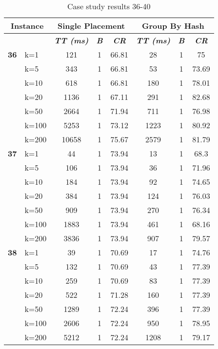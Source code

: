     \begin{table}[htbp]
    \caption{Case study results 36-40}
    \centering
    \begin{tabular}{|l|l|c|c|c|c|c|c|}
    \hline
    \multicolumn{ 2}{|c|}{\textbf{Instance}} & \multicolumn{ 3}{c|}{\textbf{Single Placement}} & \multicolumn{ 3}{c|}{\textbf{Group By Hash}} \\ \hline
    \multicolumn{ 2}{|l|}{} & \textbf{\textit{TT (ms)}} & \textbf{\textit{B}} & \textbf{\textit{CR}} & \textbf{\textit{TT (ms)}} & \textbf{\textit{B}} & \textbf{\textit{CR}} \\ \hline
    \multicolumn{1}{|r|}{\textbf{36}} & k=1 & 121 & 1 & 66.81 & 28 & 1 & 75 \\ 
     & k=5 & 343 & 1 & 66.81 & 53 & 1 & 73.69 \\ 
     & k=10 & 618 & 1 & 66.81 & 180 & 1 & 78.01 \\ 
     & k=20 & 1136 & 1 & 67.11 & 291 & 1 & 82.68 \\ 
     & k=50 & 2664 & 1 & 71.94 & 711 & 1 & 76.98 \\ 
     & k=100 & 5253 & 1 & 73.12 & 1223 & 1 & 80.92 \\ 
     & k=200 & 10658 & 1 & 75.67 & 2579 & 1 & 81.79 \\ \hline
    \multicolumn{1}{|r|}{\textbf{37}} & k=1 & 44 & 1 & 73.94 & 13 & 1 & 68.3 \\ 
     & k=5 & 106 & 1 & 73.94 & 36 & 1 & 71.96 \\ 
     & k=10 & 184 & 1 & 73.94 & 92 & 1 & 74.65 \\ 
     & k=20 & 384 & 1 & 73.94 & 124 & 1 & 76.03 \\ 
     & k=50 & 909 & 1 & 73.94 & 270 & 1 & 76.34 \\ 
     & k=100 & 1883 & 1 & 73.94 & 461 & 1 & 68.16 \\ 
     & k=200 & 3836 & 1 & 73.94 & 907 & 1 & 79.57 \\ \hline
    \multicolumn{1}{|r|}{\textbf{38}} & k=1 & 39 & 1 & 70.69 & 17 & 1 & 74.76 \\ 
     & k=5 & 132 & 1 & 70.69 & 43 & 1 & 77.39 \\ 
     & k=10 & 259 & 1 & 70.69 & 83 & 1 & 77.39 \\ 
     & k=20 & 522 & 1 & 71.28 & 160 & 1 & 77.39 \\ 
     & k=50 & 1289 & 1 & 72.24 & 396 & 1 & 77.39 \\ 
     & k=100 & 2606 & 1 & 72.24 & 950 & 1 & 78.95 \\ 
     & k=200 & 5212 & 1 & 72.24 & 1208 & 1 & 79.17 \\ \hline

\end{tabular}
\end{table}
